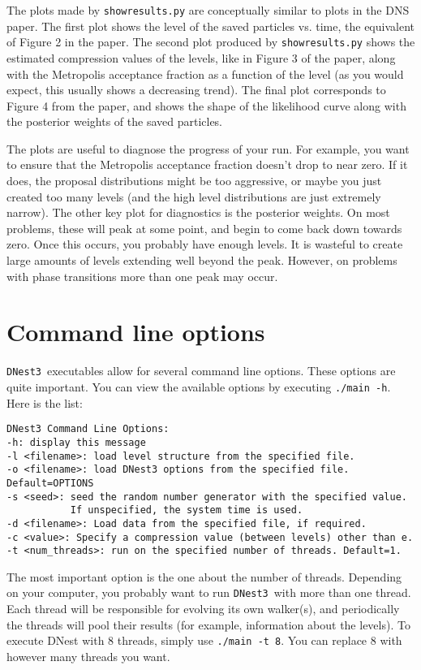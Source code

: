 \documentclass[a4paper, 11pt]{article}
\newcommand{\dnest}{{\tt DNest3}}
\begin{document}
The plots made by {\tt showresults.py} are conceptually similar to plots in
the DNS paper. The first plot shows the level of the saved particles vs.
time, the equivalent of Figure 2 in the paper. The second plot produced by
{\tt showresults.py} shows the estimated compression values of the levels,
like in Figure 3 of the paper, along with the Metropolis acceptance fraction
as a function of the level (as you would expect, this usually shows a
decreasing trend). The final plot corresponds to Figure 4 from the paper, and
shows the shape of the likelihood curve along with the posterior weights of
the saved particles.

The plots are useful to diagnose the progress of your run. For example, you
want to ensure that the Metropolis acceptance fraction doesn't drop to near
zero. If it does, the proposal distributions might be too aggressive, or maybe
you just created too many levels (and the high level distributions are just
extremely narrow). The other key plot for diagnostics is the posterior
weights. On most problems, these will peak at some point, and begin to
come back down towards zero. Once this occurs, you probably have enough levels.
It is wasteful to create large amounts of levels extending well beyond the peak.
However, on problems with phase transitions more than one peak may occur.

\section{Command line options}
\dnest~executables allow for several command line options. These options are
quite important. You can view the available options by executing
{\tt ./main -h}. Here is the list:

\begin{verbatim}
DNest3 Command Line Options:
-h: display this message
-l <filename>: load level structure from the specified file.
-o <filename>: load DNest3 options from the specified file. Default=OPTIONS
-s <seed>: seed the random number generator with the specified value.
           If unspecified, the system time is used.
-d <filename>: Load data from the specified file, if required.
-c <value>: Specify a compression value (between levels) other than e.
-t <num_threads>: run on the specified number of threads. Default=1.
\end{verbatim}
The most important option is the one about the number of threads. Depending on
your computer, you probably want to run \dnest~with more than one thread.
Each thread will be responsible for evolving its own walker(s), and periodically
the threads will pool their results (for example, information about the
levels). To execute DNest with 8 threads, simply use {\tt ./main -t 8}. You can
replace 8 with however many threads you want.
\end{document}
